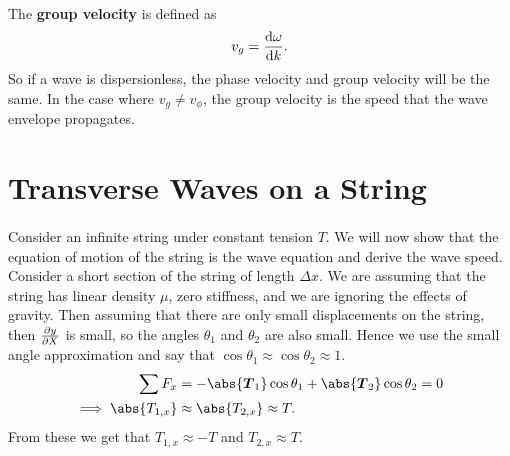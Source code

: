 \documentclass[../newtonian_mechanics.tex]{subfiles}
\begin{document}
        \paragraph{}
        The \textbf{group velocity} is defined as
        \begin{equation}
            v_g=\dv{\omega}{k}.
        \end{equation}
        So if a wave is dispersionless, the phase velocity and group velocity will be the same.
        In the case where $v_g\neq v_\phi$, the group velocity is the speed that the wave envelope propagates.

    \section{Transverse Waves on a String}
        \paragraph{}
        Consider an infinite string under constant tension $T$.
        We will now show that the equation of motion of the string is the wave equation and derive the wave speed.
        Consider a short section of the string of length $\Delta x$.
        We are assuming that the string has linear density $\mu$, zero stiffness, and we are ignoring the effects of gravity.
        Then assuming that there are only small displacements on the string, then $\pdv{y}{X}$ is small, so the angles $\theta_1$ and $\theta_2$ are also small.
        Hence we use the small angle approximation and say that $\cos\theta_1\approx\cos\theta_2\approx 1$.
        \begin{align}
            \sum F_x&=-\abs{\vec{T}_1}\cos\theta_1+\abs{\vec{T}_2}\cos\theta_2=0\\
            \implies\abs{T_{1,x}}&\approx\abs{T_{2,x}}\approx T.
        \end{align}
        From these we get that $T_{1,x}\approx -T$ and $T_{2,x}\approx T$.
        
\end{document}
